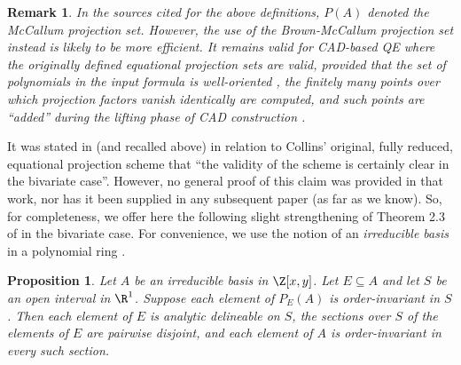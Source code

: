 \documentclass{article}
\newtheorem{proposition}{Proposition}
\newtheorem{remark}{Remark}
\begin{document}
\begin{remark}
    In the sources cited for the above definitions, $P(A)$ denoted
    the McCallum projection set. However, the use of the Brown-McCallum
    projection set instead is likely to be more efficient. It remains
    valid for CAD-based QE where the originally defined equational
    projection sets are valid, provided that the set of polynomials 
    in the input formula is well-oriented \cite{McCallum1998},
    the finitely many points over which projection factors
    vanish identically are computed,
    and such points are ``added'' during the lifting phase of CAD 
    construction \cite{Brown2001}.
\end{remark}

It was stated in \cite{McCallum1999} (and recalled above) 
in relation to Collins' original,
fully reduced, equational projection scheme that
``the validity of the scheme is certainly clear in the bivariate case''.
However, no general proof of this claim was provided in that work,
nor has it been supplied in any subsequent paper (as far as we know).
So, for completeness, we offer here the following slight strengthening
of Theorem 2.3 of \cite{McCallum1999} in the bivariate case.
For convenience, we use the notion of an {\em irreducible basis}
in a polynomial ring \cite{MPP2019}.

\begin{proposition} \label{Bivariate case}
Let $A$ be an irreducible basis in $\Z[x,y]$.
Let $E \subseteq A$ and let $S$ be an open interval in $\R^1$.
Suppose each element of $P_E(A)$ is order-invariant in $S$.
Then each element of $E$ is analytic delineable on $S$,
the sections over $S$ of the elements of $E$ are pairwise disjoint,
and each element of $A$ is order-invariant in every such section.
\end{proposition}
\end{document}
